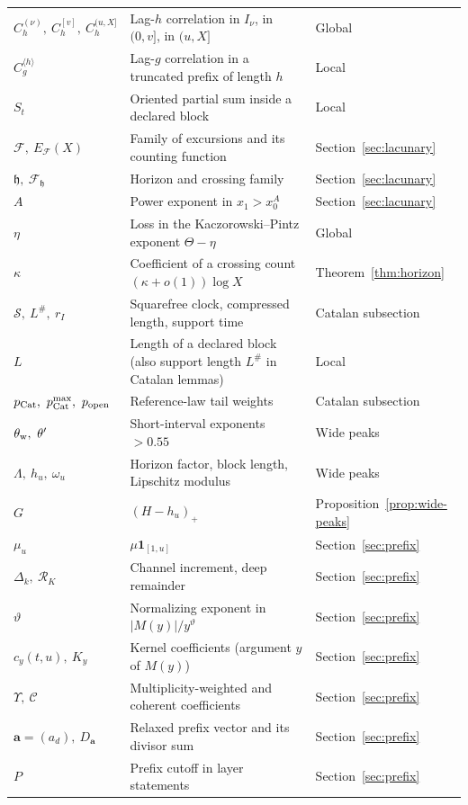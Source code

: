 \documentclass[11pt]{amsart}
\numberwithin{equation}{section}
\theoremstyle{plain}
\theoremstyle{definition}
\theoremstyle{remark}
\newcommand{\Cc}{\mathcal{C}}
\newcommand{\Sq}{\mathcal{S}}
\newcommand{\F}{\mathcal{F}}
\begin{document}
\begin{longtable}{@{}p{}p{}p{}@{}}
$C_h^{(\nu)},\ C_h^{[v]},\ C_h^{(u,X]}$ & Lag-$h$ correlation in $I_\nu$, in $(0,v]$, in $(u,X]$ & Global\\
$C_g^{\langle h\rangle}$ & Lag-$g$ correlation in a truncated prefix of length $h$ & Local\\
$S_t$ & Oriented partial sum inside a declared block & Local\\
$\F,\ E_\F(X)$ & Family of excursions and its counting function & Section~\ref{sec:lacunary}\\
$\mathfrak h,\ \F_{\mathfrak h}$ & Horizon and crossing family & Section~\ref{sec:lacunary}\\
$A$ & Power exponent in $x_1>x_0^A$ & Section~\ref{sec:lacunary}\\
$\eta$ & Loss in the Kaczorowski--Pintz exponent $\Theta-\eta$ & Global\\
$\kappa$ & Coefficient of a crossing count $(\kappa+o(1))\log X$ & Theorem~\ref{thm:horizon}\\
$\Sq,\ L^\#,\ r_I$ & Squarefree clock, compressed length, support time & Catalan subsection\\
$L$ & Length of a declared block (also support length $L^\#$ in Catalan lemmas) & Local\\
$p_{\rm Cat},\ p^{\max}_{\rm Cat},\ p_{\rm open}$ & Reference-law tail weights & Catalan subsection\\
$\theta_{\rm w},\ \theta'$ & Short-interval exponents $>0.55$ & Wide peaks\\
$\Lambda,\ h_u,\ \omega_u$ & Horizon factor, block length, Lipschitz modulus & Wide peaks\\
$G$ & $(H-h_u)_+$ & Proposition~\ref{prop:wide-peaks}\\
$\mu_u$ & $\mu\mathbf 1_{[1,u]}$ & Section~\ref{sec:prefix}\\
$\Delta_k,\ \mathcal R_K$ & Channel increment, deep remainder & Section~\ref{sec:prefix}\\
$\vartheta$ & Normalizing exponent in $|M(y)|/y^\vartheta$ & Section~\ref{sec:prefix}\\
$c_y(t,u),\ K_y$ & Kernel coefficients (argument $y$ of $M(y)$) & Section~\ref{sec:prefix}\\
$\Upsilon,\ \Cc$ & Multiplicity-weighted and coherent coefficients & Section~\ref{sec:prefix}\\
$\mathbf a=(a_d),\ D_{\mathbf a}$ & Relaxed prefix vector and its divisor sum & Section~\ref{sec:prefix}\\
$P$ & Prefix cutoff in layer statements & Section~\ref{sec:prefix}\\

\end{longtable}
\end{document}
